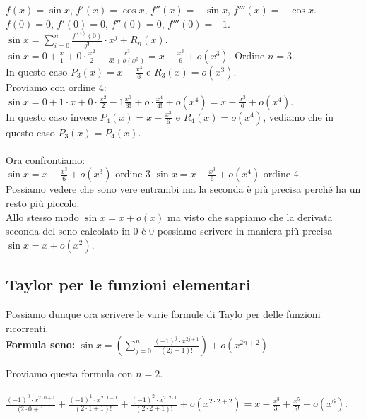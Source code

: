 \begin{example}
$f(x) = \sin{x}$, $f'(x) = \cos{x}$, $f''(x) = -\sin{x}$, $f'''(x)=-\cos{x}$.\\
$f(0) = 0$, $f'(0) = 0$, $f''(0) = 0$, $f'''(0) = -1$. $\sin{x} = \sum\limits_{i=0}^n\frac{f^{(i)}(0)}{j!} \cdot x^j + R_n(x)$.\\
$\sin{x} = 0 + \frac{x}{1} + 0 \cdot \frac{x^2}{2} - \frac{x^3}{3! + o(x^3)} = x - \frac{x^3}{6} + o(x^3)$. Ordine $n=3$.\\
In questo caso $P_3(x) = x - \frac{x^3}{6}$ e $R_3(x) = o(x^3)$.\\
Proviamo con ordine 4: $\sin{x} = 0 + 1 \cdot x + 0 \cdot \frac{x^2}{2} - 1 \frac{x^3}{3!} + o \cdot \frac{x^4}{4!} + o(x^4) = x - \frac{x^3}{6} + o(x^4)$. \\
In questo caso invece $P_4(x) = x - \frac{x^3}{6}$ e $R_4(x) = o(x^4)$, vediamo che in questo caso $P_3(x) = P_4(x)$.\\\\
Ora confrontiamo:\\
$\sin{x} = x - \frac{x^3}{6} + o(x^3)$ ordine 3 \hspace{.5cm} $\sin{x} = x - \frac{x^3}{6} + o(x^4)$ ordine 4.\\
Possiamo vedere che sono vere entrambi ma la seconda è più precisa perché ha un resto più piccolo.\\
Allo stesso modo $\sin{x} = x + o(x)$ ma visto che sappiamo che la derivata seconda del seno calcolato in 0 è 0 possiamo scrivere in maniera più precisa $\sin{x} = x + o(x^2)$.
\end{example}

\subsection{Taylor per le funzioni elementari}
Possiamo dunque ora scrivere le varie formule di Taylo per delle funzioni ricorrenti.\\

\hspace{-15pt}\textbf{Formula seno:} $\sin{x} = (\sum\limits_{j = 0}^n \frac{(-1)^j \cdot x^{2j +1}}{(2j + 1)!}) + o(x^{2n+2})$

\begin{example}
Proviamo questa formula con $n=2$.\\\\
$\frac{(-1)^0 \cdot x^{2 \cdot 0 + 1}}{(2 \cdot 0 + 1} + \frac{(-1)^1 \cdot x^{2 \cdot 1 + 1}}{(2 \cdot 1 + 1)!} + \frac{(-1)^2 \cdot x^{2 \cdot 2 \cdot 1}}{(2 \cdot 2 + 1)!} + o(x^{2 \cdot 2 + 2}) = x - \frac{x^3}{3!} + \frac{x^5}{5!} + o(x^6)$.\\
\end{example}

